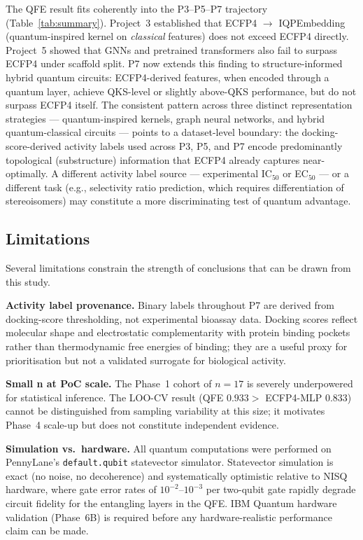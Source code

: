 The QFE result fits coherently into the P3--P5--P7 trajectory
(Table~\ref{tab:summary}). Project~3 established that ECFP4 $\to$
IQPEmbedding (quantum-inspired kernel on \emph{classical} features) does
not exceed ECFP4 directly\cite{sao2026p3}. Project~5 showed that
GNNs and pretrained transformers also fail to surpass ECFP4 under
scaffold split\cite{sao2026p5}. P7 now extends this finding to
structure-informed hybrid quantum circuits: ECFP4-derived features, when
encoded through a quantum layer, achieve QKS-level or slightly above-QKS
performance, but do not surpass ECFP4 itself. The consistent pattern
across three distinct representation strategies — quantum-inspired kernels,
graph neural networks, and hybrid quantum-classical circuits — points to a
dataset-level boundary: the docking-score-derived activity labels used across
P3, P5, and P7 encode predominantly topological (substructure) information
that ECFP4 already captures near-optimally. A different activity label
source — experimental IC$_{50}$ or EC$_{50}$ — or a different task
(e.g., selectivity ratio prediction, which requires differentiation of
stereoisomers) may constitute a more discriminating test of quantum
advantage.

\subsection{Limitations}

Several limitations constrain the strength of conclusions that can be
drawn from this study.

\textbf{Activity label provenance.} Binary labels throughout P7 are derived
from docking-score thresholding, not experimental bioassay data. Docking
scores reflect molecular shape and electrostatic complementarity with
protein binding pockets rather than thermodynamic free energies of binding;
they are a useful proxy for prioritisation but not a validated surrogate
for biological activity.

\textbf{Small n at PoC scale.} The Phase~1 cohort of $n = 17$ is
severely underpowered for statistical inference. The LOO-CV result
(QFE $0.933 > $ ECFP4-MLP $0.833$) cannot be distinguished from
sampling variability at this size; it motivates Phase~4 scale-up but
does not constitute independent evidence.

\textbf{Simulation vs.\ hardware.} All quantum computations were performed
on PennyLane's \texttt{default.qubit} statevector simulator. Statevector
simulation is exact (no noise, no decoherence) and systematically optimistic
relative to NISQ hardware, where gate error rates of $10^{-2}$--$10^{-3}$
per two-qubit gate rapidly degrade circuit fidelity for the entangling layers
in the QFE. IBM Quantum hardware validation (Phase~6B) is required before
any hardware-realistic performance claim can be made.

